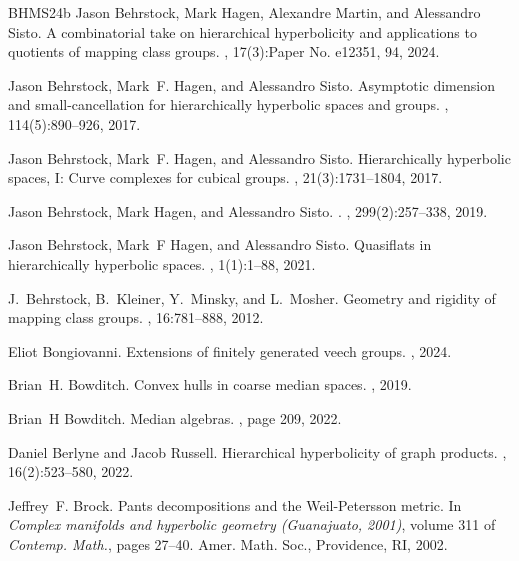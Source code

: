 \documentclass{amsart}
\theoremstyle{definition}
\theoremstyle{remark}
\theoremstyle{definition}
\begin{document}
\begin{thebibliography}{BHMS24b}
Jason Behrstock, Mark Hagen, Alexandre Martin, and Alessandro Sisto.
\newblock A combinatorial take on hierarchical hyperbolicity and applications
  to quotients of mapping class groups.
, 17(3):Paper No. e12351, 94, 2024.

Jason Behrstock, Mark~F. Hagen, and Alessandro Sisto.
\newblock Asymptotic dimension and small-cancellation for hierarchically
  hyperbolic spaces and groups.
, 114(5):890--926, 2017.

Jason Behrstock, Mark~F. Hagen, and Alessandro Sisto.
\newblock Hierarchically hyperbolic spaces, {I}: {C}urve complexes for cubical
  groups.
, 21(3):1731--1804, 2017.

Jason Behrstock, Mark Hagen, and Alessandro Sisto.
.
, 299(2):257--338, 2019.

Jason Behrstock, Mark~F Hagen, and Alessandro Sisto.
\newblock Quasiflats in hierarchically hyperbolic spaces.
, 1(1):1--88, 2021.

J.~Behrstock, B.~Kleiner, Y.~Minsky, and L.~Mosher.
\newblock Geometry and rigidity of mapping class groups.
, 16:781--888, 2012.

Eliot Bongiovanni.
\newblock Extensions of finitely generated veech groups.
, 2024.

Brian~H. Bowditch.
\newblock Convex hulls in coarse median spaces.
, 2019.

Brian~H Bowditch.
\newblock Median algebras.
, page 209, 2022.

Daniel Berlyne and Jacob Russell.
\newblock Hierarchical hyperbolicity of graph products.
, 16(2):523--580, 2022.

Jeffrey~F. Brock.
\newblock Pants decompositions and the {W}eil-{P}etersson metric.
\newblock In {\em Complex manifolds and hyperbolic geometry ({G}uanajuato,
  2001)}, volume 311 of {\em Contemp. Math.}, pages 27--40. Amer. Math. Soc.,
  Providence, RI, 2002.


\end{thebibliography}
\end{document}
